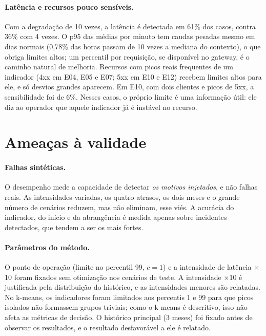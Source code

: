 \documentclass[sigconf,nonacm]{acmart}
\begin{document}
\paragraph{Latência e recursos pouco sensíveis.} Com a degradação de 10 vezes, a latência é detectada em 61\% dos casos, contra 36\% com 4 vezes. O p95 das médias por minuto tem caudas pesadas mesmo em dias normais (0,78\% das horas passam de 10 vezes a mediana do contexto), o que obriga limites altos; um percentil por requisição, se disponível no gateway, é o caminho natural de melhoria. Recursos com picos reais frequentes de um indicador (4xx em E04, E05 e E07; 5xx em E10 e E12) recebem limites altos para ele, e só desvios grandes aparecem. Em E10, com dois clientes e picos de 5xx, a sensibilidade foi de 6\%. Nesses casos, o próprio limite é uma informação útil: ele diz ao operador que aquele indicador já é instável no recurso.

\section{Ameaças à validade}\label{sec:ameacas}

\paragraph{Falhas sintéticas.} O desempenho mede a capacidade de detectar \emph{os motivos injetados}, e não falhas reais. As intensidades variadas, os quatro atrasos, os dois meses e o grande número de cenários reduzem, mas não eliminam, esse viés. A acurácia do indicador, do início e da abrangência é medida apenas sobre incidentes detectados, que tendem a ser os mais fortes.

\paragraph{Parâmetros do método.} O ponto de operação (limite no percentil 99, $c=1$) e a intensidade de latência $\times$10 foram fixados sem otimização nos cenários de teste. A intensidade $\times$10 é justificada pela distribuição do histórico, e as intensidades menores são relatadas. No k-means, os indicadores foram limitados aos percentis 1 e 99 para que picos isolados não formassem grupos triviais; como o k-means é descritivo, isso não afeta as métricas de decisão. O histórico principal (3 meses) foi fixado antes de observar os resultados, e o resultado desfavorável a ele é relatado.
\end{document}
